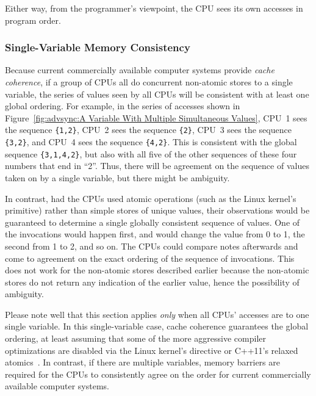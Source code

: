 Either way, from the programmer's viewpoint, the CPU sees its own accesses
in program order.

\subsubsection{Single-Variable Memory Consistency}
\label{sec:advsync:Single-Variable Memory Consistency}

Because current commercially available computer systems provide
\emph{cache coherence},
if a group of CPUs all do concurrent non-atomic stores to a single variable,
the series of values seen by all CPUs will be consistent with at
least one global ordering.
For example, in the series of accesses shown in
Figure~\ref{fig:advsync:A Variable With Multiple Simultaneous Values},
CPU~1 sees the sequence {\tt \{1,2\}},
CPU~2 sees the sequence {\tt \{2\}},
CPU~3 sees the sequence {\tt \{3,2\}},
and
CPU~4 sees the sequence {\tt \{4,2\}}.
This is consistent with the global sequence {\tt \{3,1,4,2\}},
but also with all five of the other sequences of these four numbers that end
in ``2''.
Thus, there will be agreement on the sequence of values taken on
by a single variable, but there might be ambiguity.

In contrast, had the CPUs used atomic operations (such as the Linux kernel's
 primitive) rather than simple stores of
unique values, their observations would
be guaranteed to determine a single globally consistent sequence of values.
One of the  invocations would happen first,
and would change the value from 0 to 1, the second from 1 to 2, and
so on.
The CPUs could compare notes afterwards and come to agreement on the
exact ordering of the sequence of  invocations.
This does not work for the non-atomic stores described earlier because
the non-atomic stores do not return any indication of the earlier value,
hence the possibility of ambiguity.

Please note well that this section applies \emph{only} when all
CPUs' accesses are to one single variable.
In this single-variable case, cache coherence guarantees the
global ordering, at least assuming that some of the more aggressive
compiler optimizations are disabled via the Linux kernel's
 directive or C++11's relaxed
atomics~\cite{PeteBecker2011N3242}.
In contrast, if there are multiple variables, memory barriers are
required for the CPUs to consistently agree on the order for current
commercially available computer systems.


